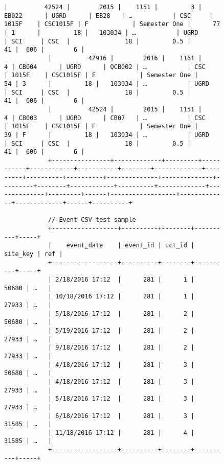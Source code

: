 \begin{figure}[H]
\begin{mdframed}[rightline=false,leftline=false]
\begin{BVerbatim}[fontsize=\tiny]
            |          42524 |        2015 |    1151 |         3 | EB022      | UGRD      | EB28   | …           | CSC     | 1015F    | CSC1015F | F            | Semester One |      77 | 1      |         18 |   103034 | …           | UGRD         | SCI     | CSC  |               18 |         0.5 |          41 |  606 |        6 |
            |          42916 |        2016 |    1161 |         4 | CB004      | UGRD      | QCB002 | …           | CSC     | 1015F    | CSC1015F | F            | Semester One |      54 | 3      |         18 |   103034 | …           | UGRD         | SCI     | CSC  |               18 |         0.5 |          41 |  606 |        6 |
            |          42524 |        2015 |    1151 |         4 | CB003      | UGRD      | CB07   | …           | CSC     | 1015F    | CSC1015F | F            | Semester One |      39 | F      |         18 |   103034 | …           | UGRD         | SCI     | CSC  |               18 |         0.5 |          41 |  606 |        6 |
            +----------------+-------------+---------+-----------+------------+-----------+--------+-------------+---------+----------+----------+--------------+--------------+---------+--------+------------+----------+-------------+--------------+---------+------+------------------+-------------+-------------+------+----------+

            // Event CSV test sample
            +------------------+----------+--------+----------+-----+
            |    event_date    | event_id | uct_id | site_key | ref |
            +------------------+----------+--------+----------+-----+
            | 2/18/2016 17:12  |      281 |      1 |    50680 | …   |
            | 10/18/2016 17:12 |      281 |      1 |    27933 | …   |
            | 5/18/2016 17:12  |      281 |      2 |    50680 | …   |
            | 5/19/2016 17:12  |      281 |      2 |    27933 | …   |
            | 9/18/2016 17:12  |      281 |      2 |    27933 | …   |
            | 4/18/2016 17:12  |      281 |      3 |    50680 | …   |
            | 4/18/2016 17:12  |      281 |      3 |    27933 | …   |
            | 5/18/2016 17:12  |      281 |      3 |    27933 | …   |
            | 6/18/2016 17:12  |      281 |      3 |    31585 | …   |
            | 11/18/2016 17:12 |      281 |      4 |    31585 | …   |
            +------------------+----------+--------+----------+-----+



\end{BVerbatim}
\end{mdframed}
\end{figure}
